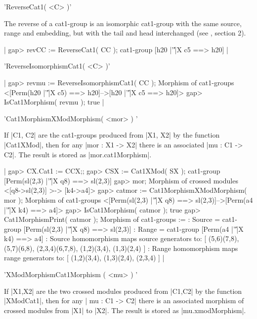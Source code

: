 %

'ReverseCat1( <C> )'

The reverse of a cat1-group is an isomorphic cat1-group with the same
source, range and embedding, but with the tail and head interchanged
(see \cite{AW1}, section 2).

|    gap> revCC := ReverseCat1( CC );
    cat1-group [h20 |'\|'|X c5 ==> h20]  |

%

'ReverseIsomorphismCat1( <C> )'

|    gap> revmu := ReverseIsomorphismCat1( CC );
    Morphism of cat1-groups
       <[Perm(h20 |'\|'|X c5) ==> h20]-->[h20 |'\|'|X c5 ==> h20]>
    gap> IsCat1Morphism( revmu );
    true  |

%

'Cat1MorphismXModMorphism( <mor> ) '

If |C1, C2| are the cat1-groups produced from |X1, X2| by the function
|Cat1XMod|, then for any |mor : X1 -> X2| there is an 
associated |mu : C1 -> C2|.
The result is stored as |mor.cat1Morphism|.

|    gap> CX.Cat1 := CCX;;
    gap> CSX := Cat1XMod( SX );
    cat1-group [Perm(sl(2,3) |'\|'|X q8) ==> sl(2,3)]
    gap> mor;
    Morphism of crossed modules <[q8->sl(2,3)] >-> [k4->a4]>
    gap> catmor := Cat1MorphismXModMorphism( mor );
    Morphism of cat1-groups
       <[Perm(sl(2,3) |'\|'|X q8) ==> sl(2,3)]-->[Perm(a4 |'\|'|X k4) ==> a4]>
    gap> IsCat1Morphism( catmor );
    true
    gap> Cat1MorphismPrint( catmor );
    Morphism of cat1-groups := 
    : Source = cat1-group [Perm(sl(2,3) |'\|'|X q8) ==> sl(2,3)] 
    :  Range = cat1-group [Perm(a4 |'\|'|X k4) ==> a4] 
    : Source homomorphism maps source generators to:
      [ (5,6)(7,8), (5,7)(6,8), (2,3,4)(6,7,8), (1,2)(3,4), (1,3)(2,4) ]
    : Range homomorphism maps range generators to:
      [ (1,2)(3,4), (1,3)(2,4), (2,3,4) ]           |

%

'XModMorphismCat1Morphism ( <mu> ) '

If |X1,X2| are the two crossed modules produced from |C1,C2| by the function
|XModCat1|, then for any | mu : C1 -> C2|  there is an
associated morphism of crossed modules from |X1| to |X2|.
The result is stored as |mu.xmodMorphism|.

